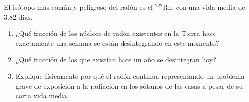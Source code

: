 \item El isótopo más común y peligroso del radón es el $^{222}\text{Rn}$, con una vida media de $3.82\text{ días}$.
\begin{enumerate}
    \item ¿Qué fracción de los núcleos de radón existentes en la Tierra hace exactamente una semana se están desintegrando en este momento?
    \item ¿Qué fracción de los que existían hace un año se desintegran hoy?
    \item Explique físicamente por qué el radón continúa representando un problema grave de exposición a la radiación en los sótanos de las casas a pesar de su corta vida media.
\end{enumerate}
